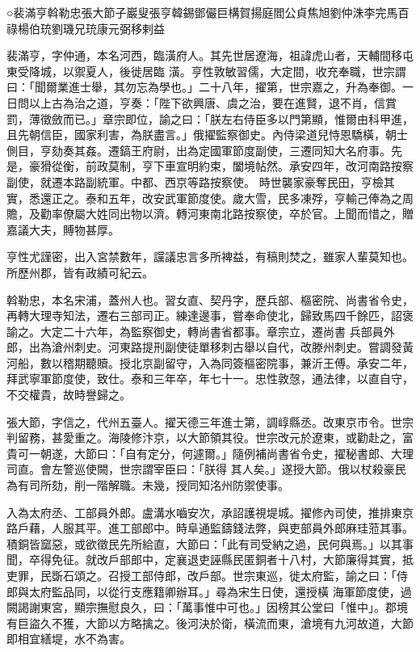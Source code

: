 
\begin{pinyinscope}

 ○裴滿亨斡勒忠張大節子巖叟張亨韓錫鄧儼巨構賀揚庭閻公貞焦旭劉仲洙李完馬百祿楊伯珫劉璣兄珫康元弼移剌益



 裴滿亨，字仲通，本名河西，臨潢府人。其先世居遼海，祖諱虎山者，天輔間移屯東受降城，以禦夏人，後徙居臨
 潢。亨性敦敏習儒，大定間，收充奉職，世宗謂曰：「聞爾業進士舉，其勿忘為學也。」二十八年，擢第，世宗嘉之，升為奉御。一日問以上古為治之道，亨奏：「陛下欲興唐、虞之治，要在進賢，退不肖，信賞罰，薄徵斂而已。」章宗即位，諭之曰：「朕左右侍臣多以門第顯，惟爾由科甲進，且先朝信臣，國家利害，為朕盡言。」俄擢監察御史。內侍梁道兒恃恩驕橫，朝士側目，亨劾奏其姦。遷鎬王府尉，出為定國軍節度副使，三遷同知大名府事。先是，豪猾從衡，前政莫制，亨下車宣明約束，闔境帖然。承安四年，改河南路按察副使，就遷本路副統軍。中都、西京等路按察使。
 時世襲家豪奪民田，亨檢其實，悉還正之。泰和五年，改安武軍節度使。歲大雪，民多凍殍，亨輸己俸為之周贍，及勸率僚屬大姓同出物以濟。轉河東南北路按察使，卒於官。上聞而惜之，贈嘉議大夫，賻物甚厚。



 亨性尤謹密，出入宮禁數年，讜議忠言多所裨益，有稿則焚之，雖家人輩莫知也。所歷州郡，皆有政績可紀云。



 斡勒忠，本名宋浦，蓋州人也。習女直、契丹字，歷兵部、樞密院、尚書省令史，再轉大理寺知法，遷右三部司正。練達邊事，嘗奉命使北，歸致馬四千餘匹，詔褒諭之。大定二十六年，為監察御史，轉尚書省都事。章宗立，遷尚書
 兵部員外郎，出為滄州刺史。河東路提刑副使徒單移刺古舉以自代，改滕州刺史。嘗調發黃河船，數以稽期聽贖。授北京副留守，入為同簽樞密院事，兼沂王傅。承安二年，拜武寧軍節度使，致仕。泰和三年卒，年七十一。忠性敦愨，通法律，以直自守，不交權貴，故時譽歸之。



 張大節，字信之，代州五臺人。擢天德三年進士第，調崞縣丞。改東京市令。世宗判留務，甚愛重之。海陵修汴京，以大節領其役。世宗改元於遼東，或勸赴之，富貴可一朝遂，大節曰：「自有定分，何遽爾。」隨例補尚書省令史，擢秘書郎、大理司直。會左警巡使闕，世宗謂宰臣曰：「朕得
 其人矣。」遂授大節。俄以杖殺豪民為有司所劾，削一階解職。未幾，授同知洺州防禦使事。



 入為太府丞、工部員外郎。盧溝水嚙安次，承詔護視堤城。擢修內司使，推排東京路戶藉，人服其平。進工部郎中。時阜通監鑄錢法弊，與吏部員外郎麻珪蒞其事。積銅皆窳惡，或欲徵民先所給直，大節曰：「此有司受納之過，民何與焉。」以其事聞，卒得免征。就改戶部郎中，定襄退吏誣縣民匿銅者十八村，大節廉得其實，抵吏罪，民斲石頌之。召授工部侍郎，改戶部。世宗東巡，徙太府監，諭之曰：「侍郎與太府監品同，以從行支應籍卿辦耳。」尋為宋生日使，還授橫
 海軍節度使，過闕謁謝東宮，顯宗撫慰良久，曰：「萬事惟中可也。」因榜其公堂曰「惟中」。郡境有巨盜久不獲，大節以方略擒之。後河決於衛，橫流而東，滄境有九河故道，大節即相宜繕堤，水不為害。




\end{pinyinscope}
